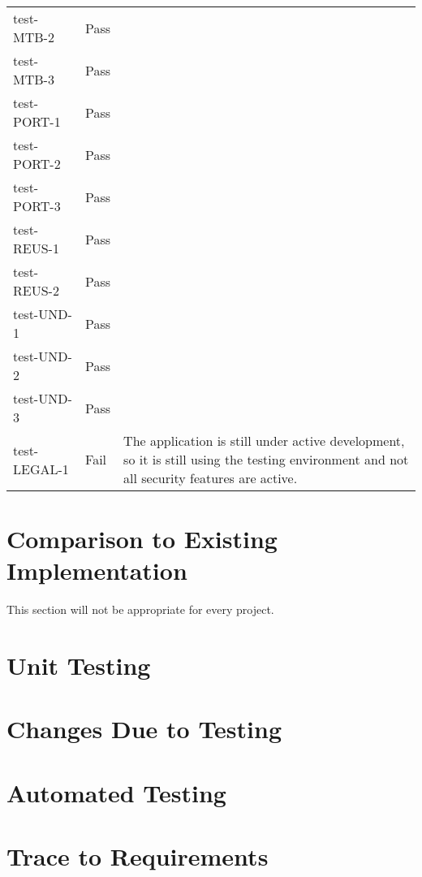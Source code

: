 \documentclass[12pt, titlepage]{article}
\begin{document}
\begin{longtable}{>{\centering\arraybackslash}p{} >{\centering\arraybackslash}p{} >{\centering\arraybackslash}p{}}
    test-MTB-2 & Pass &  \\
    test-MTB-3 & Pass &  \\
    \midrule
    test-PORT-1 & Pass &  \\
    test-PORT-2 & Pass &  \\
    test-PORT-3 & Pass &  \\
    \midrule
    test-REUS-1 & Pass &  \\
    test-REUS-2 & Pass &  \\
    \midrule
    test-UND-1 & Pass &  \\
    test-UND-2 & Pass &  \\
    test-UND-3 & Pass &  \\
    \midrule
    test-LEGAL-1 & Fail & The application is still under active development, so
    it is still using the testing environment and not all security features are
    active. \\
    \bottomrule
\end{longtable}


	
\section{Comparison to Existing Implementation}	

This section will not be appropriate for every project.

\section{Unit Testing}

\section{Changes Due to Testing}


\section{Automated Testing}
		
\section{Trace to Requirements}
		
\end{document}
